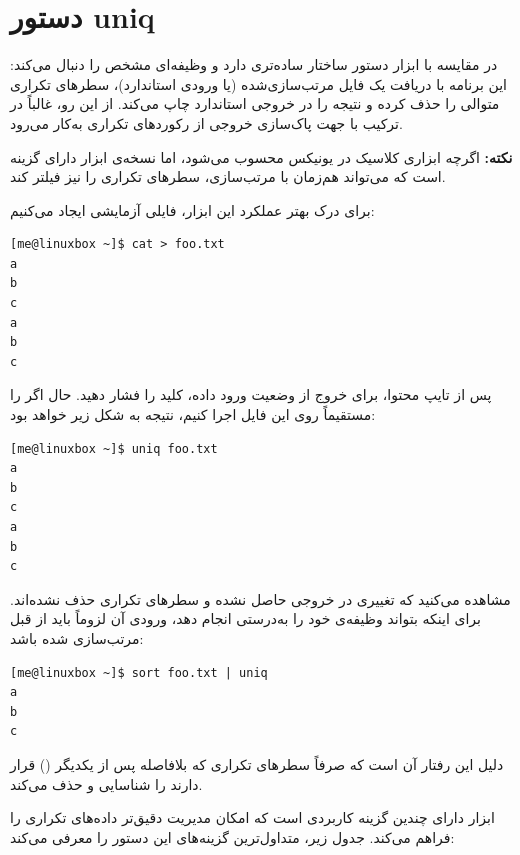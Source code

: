 \section{دستور uniq}

در مقایسه با ابزار  دستور  ساختار ساده‌تری دارد و وظیفه‌ای مشخص را دنبال می‌کند: این برنامه با دریافت یک فایل مرتب‌سازی‌شده (یا ورودی استاندارد)، سطرهای تکراری متوالی را حذف کرده و نتیجه را در خروجی استاندارد چاپ می‌کند. از این رو،  غالباً در ترکیب با  جهت پاک‌سازی خروجی از رکوردهای تکراری به‌کار می‌رود.

\begin{note}
\textbf{نکته:} اگرچه  ابزاری کلاسیک در یونیکس محسوب می‌شود، اما نسخه‌ی  ابزار  دارای گزینه  است که می‌تواند هم‌زمان با مرتب‌سازی، سطرهای تکراری را نیز فیلتر کند.
\end{note}

برای درک بهتر عملکرد این ابزار، فایلی آزمایشی ایجاد می‌کنیم:

\begin{latin}
\begin{lstlisting}
[me@linuxbox ~]$ cat > foo.txt
a
b
c
a
b
c
\end{lstlisting}
\end{latin}

پس از تایپ محتوا، برای خروج از وضعیت ورود داده، کلید  را فشار دهید. حال اگر  را مستقیماً روی این فایل اجرا کنیم، نتیجه به شکل زیر خواهد بود:

\begin{latin}
\begin{lstlisting}
[me@linuxbox ~]$ uniq foo.txt
a
b
c
a
b
c
\end{lstlisting}
\end{latin}

مشاهده می‌کنید که تغییری در خروجی حاصل نشده و سطرهای تکراری حذف نشده‌اند. برای اینکه  بتواند وظیفه‌ی خود را به‌درستی انجام دهد، ورودی آن لزوماً باید از قبل مرتب‌سازی شده باشد:

\begin{latin}
\begin{lstlisting}
[me@linuxbox ~]$ sort foo.txt | uniq
a
b
c
\end{lstlisting}
\end{latin}

دلیل این رفتار آن است که  صرفاً سطرهای تکراری که بلافاصله پس از یکدیگر () قرار دارند را شناسایی و حذف می‌کند.

ابزار  دارای چندین گزینه کاربردی است که امکان مدیریت دقیق‌تر داده‌های تکراری را فراهم می‌کند. جدول زیر، متداول‌ترین گزینه‌های این دستور را معرفی می‌کند:


